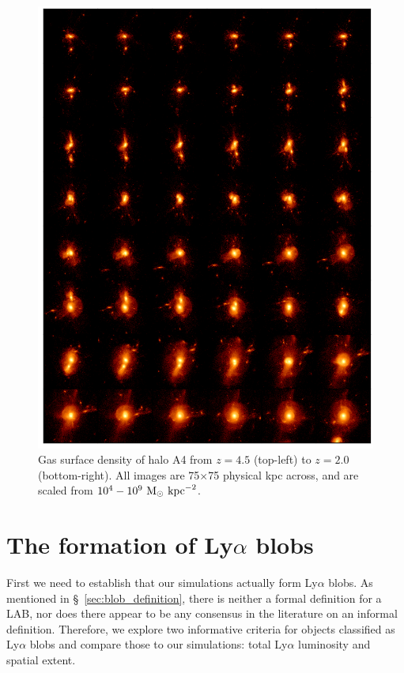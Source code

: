 \begin{figure}
    \centering
    \includegraphics[width=\textwidth,keepaspectratio]{figures/rogues_stars.png}
    \caption{
        Gas surface density of halo A4 from $z=4.5$ (top-left) to $z=2.0$ (bottom-right).
        All images are 75$\times$75 physical kpc across, and are scaled from $10^{4}-10^{9}\ \rm{M}_{\odot}\ \rm{kpc}^{-2}$.
    }
  \label{fig:A4stars}
\end{figure}



\section{The formation of Ly\texorpdfstring{$\alpha$}{a} blobs}
\label{sec:formation_of_labs}


First we need to establish that our simulations actually form Ly$\alpha$ blobs.
As mentioned in \S~\ref{sec:blob_definition}, there is neither a formal definition for a LAB, nor does there appear to be any consensus in the literature on an informal definition.
Therefore, we explore two informative criteria for objects classified as Ly$\alpha$ blobs and compare those to our simulations: total Ly$\alpha$ luminosity and spatial extent.

